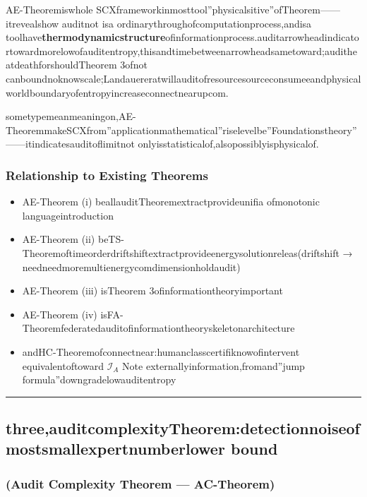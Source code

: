 \documentclass[
  12pt,
]{article}
\providecommand{\tightlist}{%
  \setlength{\itemsep}{0pt}\setlength{\parskip}{0pt}}
\begin{document}
AE-Theoremiswhole SCXframeworkinmosttool''physicalsitive''ofTheorem------itrevealshow auditnot isa  ordinarythroughofcomputationprocess,andisa  toolhave\textbf{thermodynamicstructure}ofinformationprocess.auditarrowheadindicatortowardmorelowofauditentropy,thisandtimebetweenarrowheadsametoward;auditheatdeathforshouldTheorem
3ofnot canboundnoknowscale;Landauereratwillauditofresourcesourceconsumeeandphysicalworldboundaryofentropyincreaseconnectnearupcom.

sometypemeanmeaningon,AE-TheoremmakeSCXfrom''applicationmathematical''riselevelbe''Foundationstheory''------itindicatesauditoflimitnot onlyisstatisticalof,alsopossiblyisphysicalof.

\subsubsection{Relationship to Existing Theorems}\label{ux4e0eux5df2ux6709ux5b9aux7406ux7684ux5173ux7cfb-1}

\begin{itemize}
\tightlist
\item
  AE-Theorem (i) beallauditTheoremextractprovideunifia ofmonotonic languageintroduction
\item
  AE-Theorem (ii) beTS-Theoremoftimeorderdriftshiftextractprovideenergysolutionreleas(driftshift →
  needneedmoremultienergycomdimensionholdaudit)
\item
  AE-Theorem (iii) isTheorem 3ofinformationtheoryimportant 
\item
  AE-Theorem (iv) isFA-Theoremfederatedauditofinformationtheoryskeletonarchitecture
\item
  andHC-Theoremofconnectnear:humanclasscertifiknowofintervent equivalentoftoward \(\mathcal{I}_A\)
  Note externallyinformation,fromand''jump formula''downgradelowauditentropy
\end{itemize}

\begin{center}\rule{0.5\linewidth}{0.5pt}\end{center}

\subsection{three,auditcomplexityTheorem:detectionnoiseofmostsmallexpertnumberlower bound}\label{ux4e09ux5ba1ux8ba1ux590dux6742ux5ea6ux5b9aux7406ux68c0ux6d4bux566aux58f0ux7684ux6700ux5c0fux4e13ux5bb6ux6570ux4e0bux754c}

\subsubsection{(Audit Complexity Theorem ---
AC-Theorem)}\label{audit-complexity-theorem-ac-theorem}
\end{document}
